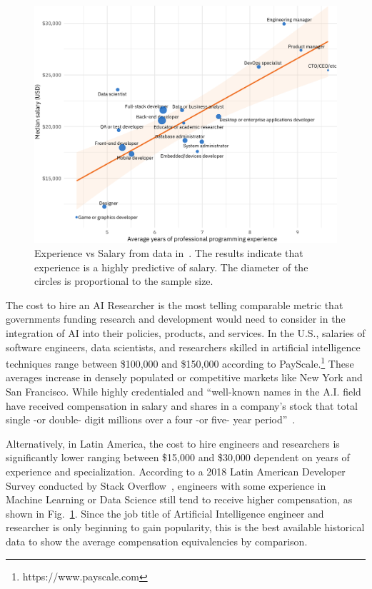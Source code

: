 \documentclass[conference]{IEEEtran}
\begin{document}
\begin{figure}[!t]
\centering
\includegraphics[width=\columnwidth]{aisalary}
\caption{Experience vs Salary from data  in~\cite{silge2018hiring}. The results indicate that experience is a highly predictive of salary. The diameter of the circles is proportional to the sample size.}
\label{fig:salary}
\end{figure}


The cost to hire an AI Researcher is the most telling comparable metric that governments funding research and development would need to consider in the integration of AI into their policies, products, and services. In the U.S., salaries of software engineers, data scientists, and researchers skilled in artificial intelligence techniques range between \$100,000 and \$150,000 according to PayScale.\footnote{https://www.payscale.com} These averages increase in densely populated or competitive markets like New York and San Francisco. While highly credentialed and ``well-known names in the A.I. field have received compensation in salary and shares in a company's stock that total single -or double- digit millions over a four -or five- year period''~\cite{metz2017tech}.

Alternatively, in Latin America, the cost to hire engineers and researchers is significantly lower ranging between \$15,000 and \$30,000 dependent on years of experience and specialization. According to a 2018 Latin American Developer Survey conducted by Stack Overflow~\cite{silge2018hiring}, engineers with some experience in Machine Learning or Data Science still tend to receive higher compensation, as shown in Fig.~\ref{fig:salary}. Since the job title of Artificial Intelligence engineer and researcher is only beginning to gain popularity, this is the best available historical data to show the average compensation equivalencies by comparison.
\end{document}
